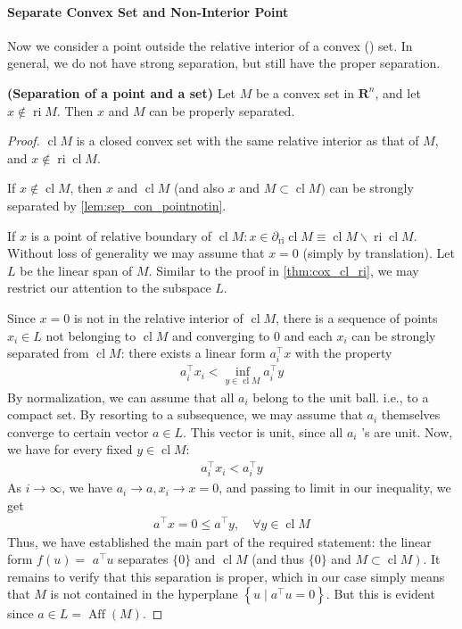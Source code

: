 \documentclass{article}
\newcommand{\bfs}[1]{\textbf{({#1}) }}
\newcommand{\cl}{\operatorname{cl}}
\newcommand{\ri}{\operatorname{ri}}
\newcommand{\Aff}{\operatorname{Aff}}
\begin{document}
\paragraph{Separate Convex Set and Non-Interior Point}
Now we consider a point outside the relative interior of a convex () set. In general, we do not have strong separation, but still have the proper separation.
\begin{lema}{\bfs{Separation of a point and a set}}\label{lem:sep_con_point_p}
Let $M$ be a convex set in $\mathbf{R}^{n}$, and let $x \notin \ri M$. Then $x$ and $M$ can be properly separated.
\end{lema}
\begin{proof}\color{ForestGreen}
$\cl M$ is a closed convex set with the same relative interior as that of $M$, and  $x \notin \ri \cl M$.
 
If $x \notin \cl M$, then $x$ and $\cl M$ (and also $x$ and $M \subset \cl M)$ can be strongly  separated by \cref{lem:sep_con_pointnotin}. 

If $x$ is a point of relative boundary of $\cl M: x \in \partial_{\mathrm{ri}} \cl M \equiv \cl M \backslash \ri \cl M$. Without loss of generality we may assume that $x=0$ (simply by translation). Let $L$ be the linear span of $M$. Similar to the proof in \cref{thm:cox_cl_ri}, we may restrict our attention to the subspace $L$. 

Since $x=0$ is not in the relative interior of $\cl M$, there is a sequence of points $x_{i}\in L$ not belonging to $\cl M$ and converging to $0$ and each $x_{i}$ can be strongly separated from $\cl M$: there exists a linear form $a_{i}^{\top} x$ with the property
\begin{align*}
a_{i}^{\top} x_{i}<\inf _{y \in \cl M} a_{i}^{\top} y
\end{align*}
By normalization, we can assume that all $a_i$ belong to the unit ball. i.e., to a compact set. By resorting to a subsequence, we may assume that $a_{i}$ themselves converge to certain vector $a \in L$. This vector is unit, since all $a_{i}$ 's are unit. Now, we have for every fixed $y \in \cl M:$
\begin{align*}
a_{i}^{\top} x_{i}<a_{i}^{\top} y
\end{align*}
As $i \rightarrow \infty$, we have $a_{i} \rightarrow a, x_{i} \rightarrow x=0$, and passing to limit in our inequality, we get
\begin{align*}
a^{\top} x=0 \leq a^{\top} y, \quad \forall y \in \cl M
\end{align*}
Thus, we have established the main part of the required statement: the linear form $f(u)=$ $a^{\top} u$ separates $\{0\}$ and $\cl M$ (and thus $\{0\}$ and $\left.M \subset \cl M\right) .$ It remains to verify that this separation is proper, which in our case simply means that $M$ is not contained in the hyperplane $\left\{u \mid a^{\top} u=0\right\} .$ But this is evident since $a\in L =\Aff (M)$.
\end{proof}
\end{document}
